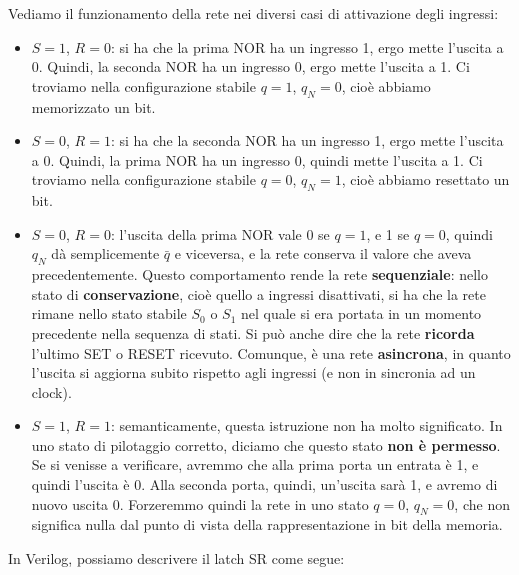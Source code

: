 \documentclass[a4paper,11pt]{article}
\begin{document}
Vediamo il funzionamento della rete nei diversi casi di attivazione degli ingressi:
\begin{itemize}
	\item $S=1$, $R=0$: si ha che la prima NOR ha un ingresso 1, ergo mette l'uscita a 0. Quindi, la seconda NOR ha un ingresso 0, ergo mette l'uscita a 1. Ci troviamo nella configurazione stabile $q=1$, $q_N = 0$, cioè abbiamo memorizzato un bit. 
	\item $S=0$, $R=1$: si ha che la seconda NOR ha un ingresso 1, ergo mette l'uscita a 0. Quindi, la prima NOR ha un ingresso 0, quindi mette l'uscita a 1. Ci troviamo nella configurazione stabile $q=0$, $q_N = 1$, cioè abbiamo resettato un bit.
	\item $S=0$, $R=0$: l'uscita della prima NOR vale 0 se $q=1$, e 1 se $q=0$, quindi $q_N$ dà semplicemente $\bar{q}$ e viceversa, e la rete conserva il valore che aveva precedentemente. Questo comportamento rende la rete \textbf{sequenziale}: nello stato di \textbf{conservazione}, cioè quello a ingressi disattivati, si ha che la rete rimane nello stato stabile $S_0$ o $S_1$ nel quale si era portata in un momento precedente nella sequenza di stati.
		Si può anche dire che la rete \textbf{ricorda} l'ultimo SET o RESET ricevuto.
		Comunque, è una rete \textbf{asincrona}, in quanto l'uscita si aggiorna subito rispetto agli ingressi (e non in sincronia ad un clock).
	\item $S=1$, $R=1$: semanticamente, questa istruzione non ha molto significato. In uno stato di pilotaggio corretto, diciamo che questo stato \textbf{non è permesso}.
		Se si venisse a verificare, avremmo che alla prima porta un entrata è 1, e quindi l'uscita è 0. Alla seconda porta, quindi, un'uscita sarà 1, e avremo di nuovo uscita 0.
		Forzeremmo quindi la rete in uno stato $q=0$, $q_N=0$, che non significa nulla dal punto di vista della rappresentazione in bit della memoria.
\end{itemize}

In Verilog, possiamo descrivere il latch SR come segue:


\end{document}

